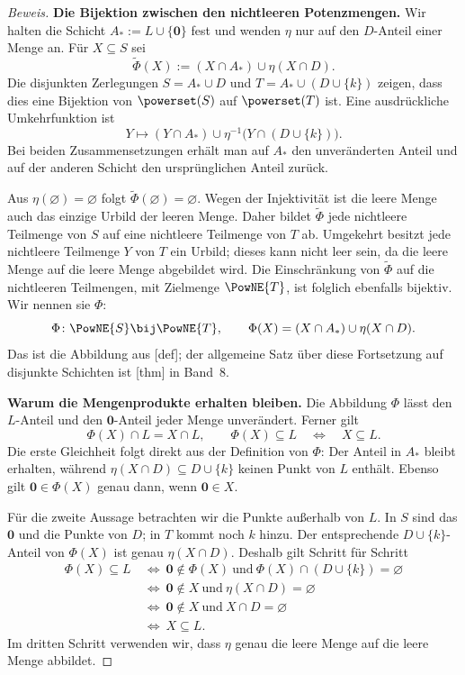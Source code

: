 \begin{proof}[Beweis]
\medskip\noindent
\textbf{Die Bijektion zwischen den nichtleeren Potenzmengen.}
Wir halten die Schicht \(A_*:=L\cup\{\mathbf0\}\) fest und
wenden \(\eta\) nur auf den \(D\)-Anteil einer Menge an.
Für \(X\subseteq S\) sei
\[
  \widetilde\Phi(X):=(X\cap A_*)\cup\eta(X\cap D).
\]
Die disjunkten Zerlegungen
\(S=A_*\cup D\) und \(T=A_*\cup(D\cup\{k\})\)
zeigen, dass dies eine Bijektion von \(\powerset(S)\) auf
\(\powerset(T)\) ist. Eine ausdrückliche Umkehrfunktion ist
\[
  Y\longmapsto
    (Y\cap A_*)\cup\eta^{-1}\bigl(Y\cap(D\cup\{k\})\bigr).
\]
Bei beiden Zusammensetzungen erhält man auf \(A_*\) den unveränderten
Anteil und auf der anderen Schicht den ursprünglichen Anteil zurück.

Aus \(\eta(\varnothing)=\varnothing\) folgt
\(\widetilde\Phi(\varnothing)=\varnothing\).
Wegen der Injektivität ist die leere Menge auch das einzige Urbild
der leeren Menge. Daher bildet \(\widetilde\Phi\) jede nichtleere
Teilmenge von \(S\) auf eine nichtleere Teilmenge von \(T\) ab.
Umgekehrt besitzt jede nichtleere Teilmenge \(Y\) von \(T\)
ein Urbild; dieses kann nicht leer sein, da die leere Menge auf die
leere Menge abgebildet wird. Die Einschränkung von
\(\widetilde\Phi\) auf die nichtleeren Teilmengen, mit Zielmenge
\(\PowNE{T}\), ist folglich ebenfalls bijektiv. Wir nennen sie
\(\Phi\):
\[
  \Phi\colon\PowNE{S}\bij\PowNE{T},
  \qquad \Phi(X)=(X\cap A_*)\cup\eta(X\cap D).
\]
Das ist die Abbildung aus [def];
der allgemeine Satz über diese Fortsetzung auf disjunkte Schichten ist
[thm] in Band~8.

\medskip\noindent
\textbf{Warum die Mengenprodukte erhalten bleiben.}
Die Abbildung \(\Phi\) lässt den \(L\)-Anteil und den
\(\mathbf0\)-Anteil jeder Menge unverändert. Ferner gilt
\[
  \Phi(X)\cap L=X\cap L,
  \qquad
  \Phi(X)\subseteq L\quad\Longleftrightarrow\quad X\subseteq L.
\]
Die erste Gleichheit folgt direkt aus der Definition von \(\Phi\):
Der Anteil in \(A_*\) bleibt erhalten, während
\(\eta(X\cap D)\subseteq D\cup\{k\}\) keinen Punkt von
\(L\) enthält. Ebenso gilt
\(\mathbf0\in\Phi(X)\) genau dann, wenn \(\mathbf0\in X\).

Für die zweite Aussage betrachten wir die Punkte außerhalb von
\(L\). In \(S\) sind das \(\mathbf0\) und die Punkte von
\(D\); in \(T\) kommt noch \(k\) hinzu. Der entsprechende
\(D\cup\{k\}\)-Anteil von \(\Phi(X)\) ist genau
\(\eta(X\cap D)\). Deshalb gilt Schritt für Schritt
\[
  \begin{aligned}
    \Phi(X)\subseteq L
      &\ \Longleftrightarrow\
        \mathbf0\notin\Phi(X)\ \text{und}\
        \Phi(X)\cap(D\cup\{k\})=\varnothing\\
      &\ \Longleftrightarrow\
        \mathbf0\notin X\ \text{und}\
        \eta(X\cap D)=\varnothing\\
      &\ \Longleftrightarrow\
        \mathbf0\notin X\ \text{und}\ X\cap D=\varnothing\\
      &\ \Longleftrightarrow\ X\subseteq L.
  \end{aligned}
\]
Im dritten Schritt verwenden wir, dass \(\eta\) genau die leere
Menge auf die leere Menge abbildet.


\end{proof}
